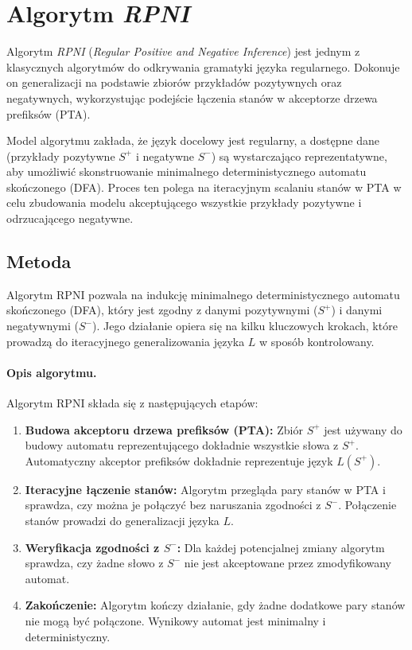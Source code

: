 \section{Algorytm \textit{RPNI}}
\label{sec:rpni}

Algorytm \textit{RPNI} (\textit{Regular Positive and Negative Inference}) \cite{RPNI} jest jednym z klasycznych algorytmów do odkrywania gramatyki języka regularnego. Dokonuje on generalizacji na podstawie zbiorów przykładów pozytywnych oraz negatywnych, wykorzystując podejście łączenia stanów w akceptorze drzewa prefiksów (PTA).

Model algorytmu zakłada, że język docelowy jest regularny, a dostępne dane (przykłady pozytywne \( S^+ \) i negatywne \( S^- \)) są wystarczająco reprezentatywne, aby umożliwić skonstruowanie minimalnego deterministycznego automatu skończonego (DFA). Proces ten polega na iteracyjnym scalaniu stanów w PTA w celu zbudowania modelu akceptującego wszystkie przykłady pozytywne i odrzucającego negatywne.

\subsection{Metoda}

Algorytm RPNI pozwala na indukcję minimalnego deterministycznego automatu skończonego (DFA), który jest zgodny z danymi pozytywnymi (\( S^+ \)) i danymi negatywnymi (\( S^- \)). Jego działanie opiera się na kilku kluczowych krokach, które prowadzą do iteracyjnego generalizowania języka \( L \) w sposób kontrolowany.

\paragraph*{Opis algorytmu.}
Algorytm RPNI składa się z następujących etapów:
\begin{enumerate}
    \item \textbf{Budowa akceptoru drzewa prefiksów (PTA):}
        Zbiór \( S^+ \) jest używany do budowy automatu reprezentującego dokładnie wszystkie słowa z \( S^+ \). Automatyczny akceptor prefiksów dokładnie reprezentuje język \( L(S^+) \).
    \item \textbf{Iteracyjne łączenie stanów:}
        Algorytm przegląda pary stanów w PTA i sprawdza, czy można je połączyć bez naruszania zgodności z \( S^- \). Połączenie stanów prowadzi do generalizacji języka \( L \).
    \item \textbf{Weryfikacja zgodności z \( S^- \):}
        Dla każdej potencjalnej zmiany algorytm sprawdza, czy żadne słowo z \( S^- \) nie jest akceptowane przez zmodyfikowany automat.
    \item \textbf{Zakończenie:} 
        Algorytm kończy działanie, gdy żadne dodatkowe pary stanów nie mogą być połączone. Wynikowy automat jest minimalny i deterministyczny.
\end{enumerate}

